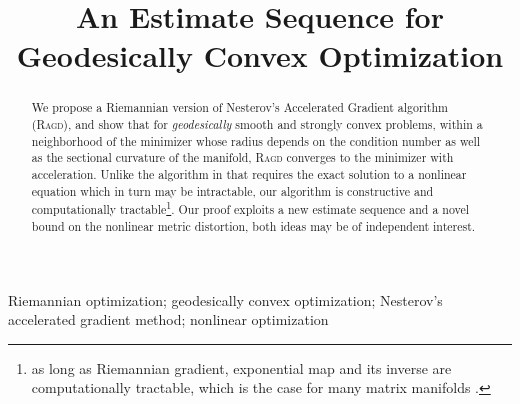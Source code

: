 \documentclass[final]{colt2018} %
\title[An Estimate Sequence for Geodesically Convex Optimization]{An Estimate Sequence for Geodesically Convex Optimization}
\newcommand{\ragd}{\textsc{Ragd}}
\begin{document}
\maketitle

\begin{abstract}
We propose a Riemannian version of Nesterov's Accelerated Gradient algorithm (\ragd), and show that for \emph{geodesically} smooth and strongly convex problems, within a neighborhood of the minimizer whose radius depends on the condition number as well as the sectional curvature of the manifold, \ragd{} converges to the minimizer with acceleration. Unlike the algorithm in \citep{liu2017accelerated} that requires the exact solution to a nonlinear equation which in turn may be intractable, our algorithm is constructive and computationally tractable\footnote{ as long as Riemannian gradient, exponential map and its inverse are computationally tractable, which is the case for many matrix manifolds \citep{absil2009optimization}.}. Our proof exploits a new estimate sequence and a novel bound on the nonlinear metric distortion, both ideas may be of independent interest.
\end{abstract}

\begin{keywords}
	Riemannian optimization; geodesically convex optimization; Nesterov's accelerated gradient method; nonlinear optimization
\end{keywords}










{\small
	
}

\newpage

\end{document}
